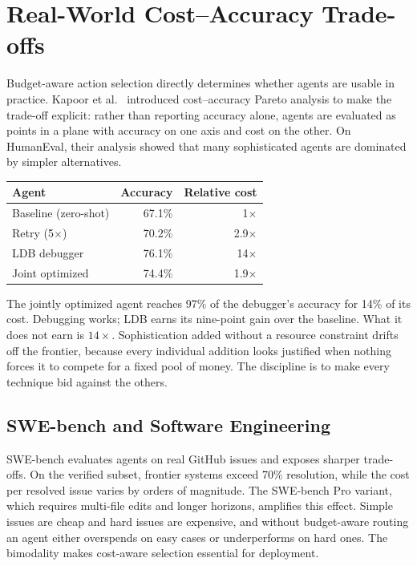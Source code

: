 \documentclass[11pt]{book}
\begin{document}
\section{Real-World Cost--Accuracy Trade-offs}

Budget-aware action selection directly determines whether agents are usable in practice. Kapoor et al.\ \cite{kapoor2024agents} introduced cost--accuracy Pareto analysis to make the trade-off explicit: rather than reporting accuracy alone, agents are evaluated as points in a plane with accuracy on one axis and cost on the other. On HumanEval, their analysis showed that many sophisticated agents are dominated by simpler alternatives.

\begin{center}
\begin{tabular}{lrr}
\toprule
Agent & Accuracy & Relative cost \\
\midrule
Baseline (zero-shot) & 67.1\% & 1$\times$ \\
Retry (5$\times$) & 70.2\% & 2.9$\times$ \\
LDB debugger & 76.1\% & 14$\times$ \\
Joint optimized & 74.4\% & 1.9$\times$ \\
\bottomrule
\end{tabular}
\end{center}

The jointly optimized agent reaches 97\% of the debugger's accuracy for 14\% of its cost. Debugging works; LDB earns its nine-point gain over the baseline. What it does not earn is $14\times$. Sophistication added without a resource constraint drifts off the frontier, because every individual addition looks justified when nothing forces it to compete for a fixed pool of money. The discipline is to make every technique bid against the others.

\subsection{SWE-bench and Software Engineering}

SWE-bench \cite{jimenez2024swebench} evaluates agents on real GitHub issues and exposes sharper trade-offs. On the verified subset, frontier systems exceed 70\% resolution, while the cost per resolved issue varies by orders of magnitude. The SWE-bench Pro variant, which requires multi-file edits and longer horizons, amplifies this effect. Simple issues are cheap and hard issues are expensive, and without budget-aware routing an agent either overspends on easy cases or underperforms on hard ones. The bimodality makes cost-aware selection essential for deployment.
\end{document}
